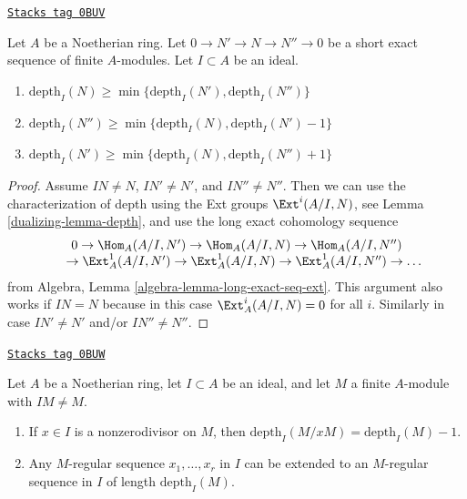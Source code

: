 \begin{lemma}
\label{dualizing-lemma-depth-in-ses}
\href{https://stacks.math.columbia.edu/tag/0BUV}{\texttt{Stacks tag 0BUV}}

Let $A$ be a Noetherian ring. Let $0 \to N' \to N \to N'' \to 0$
be a short exact sequence of finite $A$-modules.
Let $I \subset A$ be an ideal.
\begin{enumerate}
\item
$\text{depth}_I(N) \geq \min\{\text{depth}_I(N'), \text{depth}_I(N'')\}$
\item
$\text{depth}_I(N'') \geq \min\{\text{depth}_I(N), \text{depth}_I(N') - 1\}$
\item
$\text{depth}_I(N') \geq \min\{\text{depth}_I(N), \text{depth}_I(N'') + 1\}$
\end{enumerate}
\end{lemma}

\begin{proof}

Assume $IN \not = N$, $IN' \not = N'$, and $IN'' \not = N''$. Then we
can use the characterization of depth using the Ext groups
$\Ext^i(A/I, N)$, see Lemma \ref{dualizing-lemma-depth},
and use the long exact cohomology sequence
$$
\begin{matrix}
0
\to \Hom_A(A/I, N')
\to \Hom_A(A/I, N)
\to \Hom_A(A/I, N'')
\\
\phantom{0\ }
\to \Ext^1_A(A/I, N')
\to \Ext^1_A(A/I, N)
\to \Ext^1_A(A/I, N'')
\to \ldots
\end{matrix}
$$
from Algebra, Lemma \ref{algebra-lemma-long-exact-seq-ext}.
This argument also works if $IN = N$
because in this case $\Ext^i_A(A/I, N) = 0$ for all $i$.
Similarly in case $IN' \not = N'$ and/or $IN'' \not = N''$.
\end{proof}

\begin{lemma}
\label{dualizing-lemma-depth-drops-by-one}
\href{https://stacks.math.columbia.edu/tag/0BUW}{\texttt{Stacks tag 0BUW}}

Let $A$ be a Noetherian ring, let $I \subset A$ be an ideal, and
let $M$ a finite $A$-module with $IM \not = M$.
\begin{enumerate}
\item If $x \in I$ is a nonzerodivisor on $M$, then
$\text{depth}_I(M/xM) = \text{depth}_I(M) - 1$.
\item Any $M$-regular sequence $x_1, \ldots, x_r$ in $I$ can be extended to an
$M$-regular sequence in $I$ of length $\text{depth}_I(M)$.
\end{enumerate}
\end{lemma}

